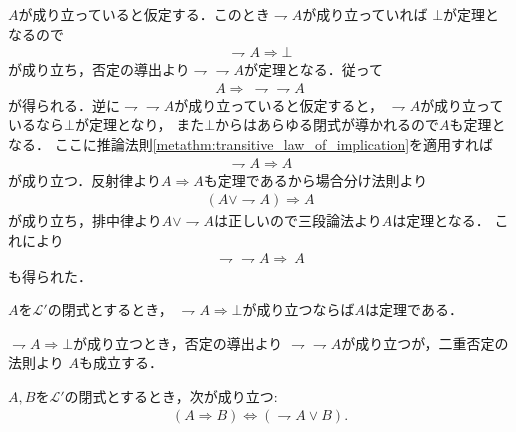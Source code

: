 	\begin{prf}
		$A$が成り立っていると仮定する．このとき$\rightharpoondown A$が成り立っていれば
		$\bot$が定理となるので
		\begin{align}
			\rightharpoondown A \Longrightarrow \bot
		\end{align}
		が成り立ち，否定の導出より$\rightharpoondown \rightharpoondown A$が定理となる．従って
		\begin{align}
			A \Longrightarrow\ \rightharpoondown \rightharpoondown A
		\end{align}
		が得られる．逆に$\rightharpoondown \rightharpoondown A$が成り立っていると仮定すると，
		$\rightharpoondown A$が成り立っているなら$\bot$が定理となり，
		また$\bot$からはあらゆる閉式が導かれるので$A$も定理となる．
		ここに推論法則\ref{metathm:transitive_law_of_implication}を適用すれば
		\begin{align}
			\rightharpoondown A \Longrightarrow A
		\end{align}
		が成り立つ．反射律より$A \Longrightarrow A$も定理であるから場合分け法則より
		\begin{align}
			(A \vee \rightharpoondown A) \Longrightarrow A
		\end{align}
		が成り立ち，排中律より$A \vee \rightharpoondown A$は正しいので三段論法より$A$は定理となる．
		これにより
		\begin{align}
			\rightharpoondown \rightharpoondown A \Longrightarrow\ A
		\end{align}
		も得られた．
		\QED
	\end{prf}
	
	\begin{screen}
		\begin{metathm}[背理法の原理]
			$A$を$\mathcal{L}'$の閉式とするとき，
			$\rightharpoondown A \Longrightarrow \bot$が成り立つならば$A$は定理である．
		\end{metathm}
	\end{screen}
	
	\begin{prf}
		$\rightharpoondown A \Longrightarrow \bot$が成り立つとき，否定の導出より
		$\rightharpoondown \rightharpoondown A$が成り立つが，二重否定の法則より
		$A$も成立する．
		\QED
	\end{prf}
	
	\begin{screen}
		\begin{metathm}[含意は否定と論理和で表せる]\label{metathm:rule_of_inference_3}
			$A,B$を$\mathcal{L}'$の閉式とするとき，次が成り立つ:
			\begin{align}
				(A \Longrightarrow B) \Longleftrightarrow (\rightharpoondown A \vee B).
			\end{align}
		\end{metathm}
	\end{screen}
	
